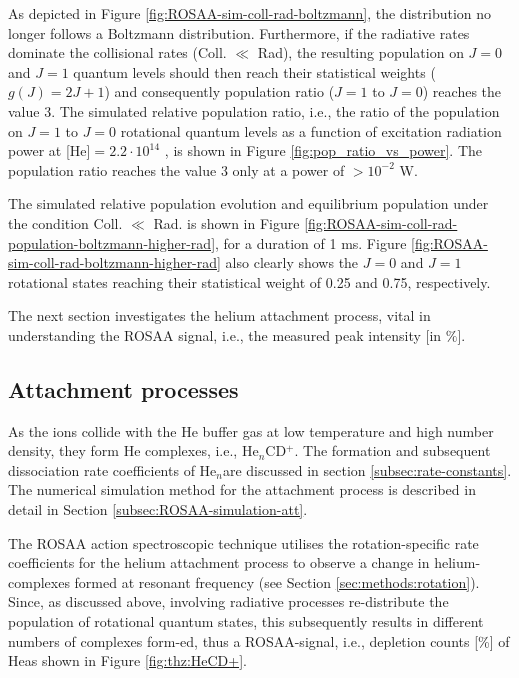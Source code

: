 As depicted in Figure \ref{fig:ROSAA-sim-coll-rad-boltzmann}, the distribution
no longer follows a Boltzmann distribution. Furthermore, if the radiative rates
dominate the collisional rates (Coll. $\ll$ Rad), the resulting population on $J=0$ and $J=1$ 
quantum levels should then reach their statistical weights ($g(J) = 2J + 1$) and 
consequently population ratio ($J=1$ to $J=0$) reaches the value 3. 
The simulated relative population ratio, i.e., the ratio of the population on $J=1$ to $J=0$ 
rotational quantum levels as a function of excitation radiation power at [He]$=2.2\cdot10^{14}$ \percc, 
is shown in Figure \ref{fig:pop_ratio_vs_power}. The population ratio reaches the value 3 only at a power of $> 10^{-2}$ W.



The simulated relative population evolution and equilibrium population under the 
condition Coll. $\ll$ Rad. is shown in Figure 
\ref{fig:ROSAA-sim-coll-rad-population-boltzmann-higher-rad}, for a duration of 1 ms. Figure
\ref{fig:ROSAA-sim-coll-rad-boltzmann-higher-rad} also clearly shows the $J=0$
and $J=1$ rotational states reaching their statistical weight of 0.25 and 0.75,
respectively.

The next section investigates the helium attachment process, vital in
understanding the ROSAA signal, i.e., the measured peak intensity [in $\%$].

\subsection{Attachment processes}
\label{subsec:CD+-kinetics-simulation-coll-rad-att}

As the \CD ions collide with the He buffer gas at low temperature and high
number density, they form He complexes, i.e., He$_n$CD$^+$. The formation and
subsequent dissociation rate coefficients of He$_n$\CD are discussed in section
\ref{subsec:rate-constants}. The numerical simulation method for the attachment
process is described in detail in Section \ref{subsec:ROSAA-simulation-att}.

The ROSAA action spectroscopic technique utilises the rotation-specific
rate coefficients for the helium attachment process to observe a change in
helium-complexes formed at resonant frequency (see Section
\ref{sec:methods:rotation}). Since, as discussed above, involving radiative
processes re-distribute the population of rotational quantum states, this
subsequently results in different numbers of complexes form-ed, thus a
ROSAA-signal, i.e., depletion counts [\%] of He\CD as shown in Figure
\ref{fig:thz:HeCD+}.

